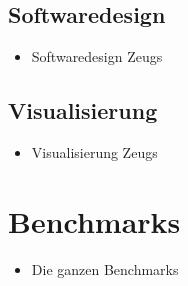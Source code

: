 \documentclass{beamer}
\begin{document}
\subsection{Softwaredesign}
\begin{frame}
\begin{itemize}
  \item Softwaredesign Zeugs
\end{itemize}
\end{frame}

\subsection{Visualisierung}
\begin{frame}
\begin{itemize}
  \item Visualisierung Zeugs
\end{itemize}
\end{frame}

\section{Benchmarks}
\begin{frame}
\begin{itemize}
  \item Die ganzen Benchmarks
\end{itemize}
\end{frame}
\end{document}
